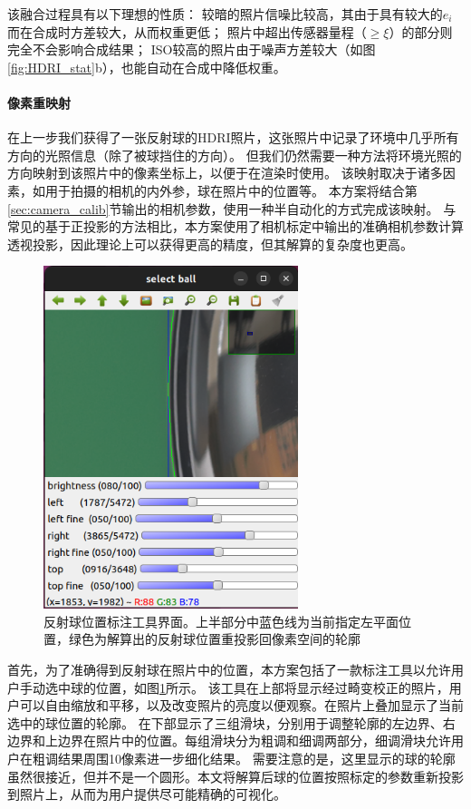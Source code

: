 该融合过程具有以下理想的性质：
较暗的照片信噪比较高，其由于具有较大的$e_i$而在合成时方差较大，从而权重更低；
照片中超出传感器量程（$\geq\xi$）的部分则完全不会影响合成结果；
ISO较高的照片由于噪声方差较大（如图\ref{fig:HDRI_stat}b），也能自动在合成中降低权重。

\paragraph{像素重映射}
在上一步我们获得了一张反射球的HDRI照片，这张照片中记录了环境中几乎所有方向的光照信息（除了被球挡住的方向）。
但我们仍然需要一种方法将环境光照的方向映射到该照片中的像素坐标上，以便于在渲染时使用。
该映射取决于诸多因素，如用于拍摄的相机的内外参，球在照片中的位置等。
本方案将结合第\ref{sec:camera_calib}节输出的相机参数，使用一种半自动化的方式完成该映射。
与常见的基于正投影的方法相比，本方案使用了相机标定中输出的准确相机参数计算透视投影，因此理论上可以获得更高的精度，但其解算的复杂度也更高。

\begin{figure}
\centering
\includegraphics[height=10cm]{figures/sphere_locator}
\caption[反射球位置标注工具界面]{反射球位置标注工具界面。上半部分中蓝色线为当前指定左平面位置，绿色为解算出的反射球位置重投影回像素空间的轮廓}
\label{fig:sphere_locator}
\end{figure}
首先，为了准确得到反射球在照片中的位置，本方案包括了一款标注工具以允许用户手动选中球的位置，如图\ref{fig:sphere_locator}所示。
该工具在上部将显示经过畸变校正的照片，用户可以自由缩放和平移，以及改变照片的亮度以便观察。在照片上叠加显示了当前选中的球位置的轮廓。
在下部显示了三组滑块，分别用于调整轮廓的左边界、右边界和上边界在照片中的位置。每组滑块分为粗调和细调两部分，细调滑块允许用户在粗调结果周围10像素进一步细化结果。
需要注意的是，这里显示的球的轮廓虽然很接近，但并不是一个圆形。本文将解算后球的位置按照标定的参数重新投影到照片上，从而为用户提供尽可能精确的可视化。

